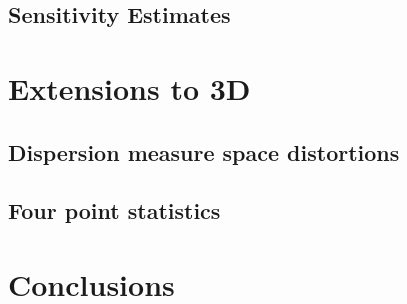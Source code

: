 \documentclass[onecolumn,prd,noshowpacs,nofootinbib,amsmath,amssymb]{revtex4}
\begin{document}
\subsection{Sensitivity Estimates}


\section{Extensions to 3D}

\subsection{Dispersion measure space distortions}

\subsection{Four point statistics}


\section{Conclusions}
\end{document}
